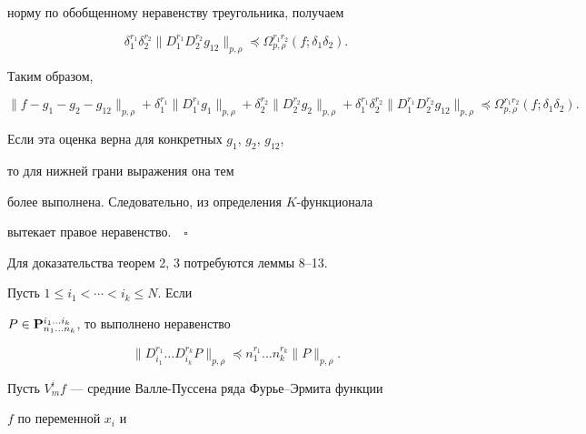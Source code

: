 норму по обобщенному неравенству треугольника, получаем 


$$ 


\delta^{r_1}_1\delta^{r_2}_2\|D^{r_1}_1D^{r_2}_2g_{12}\|_{p,\rho} 


\preceq\Omega^{r_1r_2}_{p,\rho}(f;\delta_1\delta_2). 


$$ 


 


Таким образом, 


$$ 


\|f-g_1-g_2-g_{12}\|_{p,\rho}+\delta^{r_1}_1 


\|D^{r_1}_1g_1\|_{p,\rho}+ 


\delta^{r_2}_2\|D^{r_2}_2g_2\|_{p,\rho}+ 


\delta^{r_1}_1\delta^{r_2}_2\|D^{r_1}_1D^{r_2}_2g_{12}\|_{p,\rho} 


\preceq\Omega^{r_1r_2}_{p,\rho}(f;\delta_1\delta_2). 


$$ 


Если эта оценка верна для конкретных $g_1$, $g_2$, $g_{12}$, 


то для нижней грани выражения она тем 


более выполнена. Следовательно, из определения $K$-функционала 


вытекает правое неравенство.$\quad\square$ 


 


Для доказательства теорем 2, 3 потребуются леммы 8--13. 


 


\begin{lem} 


Пусть $1\le i_1<\dotsb<i_k\le N$. Если 


$P\in\bold P^{i_1\dotsc i_k}_{n_1\dotsc n_k}$, то выполнено неравенство 


$$ 


\|D^{r_1}_{i_1}\dotsc D^{r_k}_{i_k}P\|_{p,\rho}\preceq 


n^{r_1}_1\dotsc n^{r_k}_k\|P\|_{p,\rho}. 


$$ 


\end{lem} 


 


Пусть $V^i_m f$ --- средние Валле-Пуссена ряда Фурье--Эрмита функции 


$f$ по переменной $x_i$ и 


